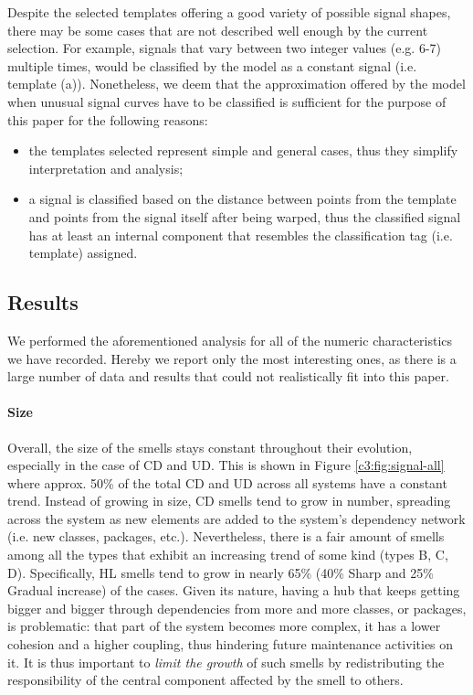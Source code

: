 Despite the selected templates offering a good variety of possible signal shapes, there may be some cases that are not described well enough by the current selection. For example, signals that vary between two integer values (e.g. 6-7) multiple times, would be classified by the model as a constant signal (i.e. template (a)).
Nonetheless, we deem that the approximation offered by the model when unusual signal curves have to be classified is sufficient for the purpose of this paper for the following reasons:
\begin{itemize}
    \item the templates selected represent simple and general cases, thus they simplify interpretation and analysis;
    \item a signal is classified based on the distance between points from the template and points from the signal itself after being warped, thus the classified signal has at least an internal component that resembles the classification tag (i.e. template) assigned.
\end{itemize}

\subsection{Results}
We performed the aforementioned analysis for all of the numeric characteristics we have recorded.
Hereby we report only the most interesting ones, as there is a large number of data and results that could not realistically fit into this paper.
\paragraph{Size}
Overall, the size of the smells stays constant throughout their evolution, especially in the case of CD and UD. This is shown in Figure \ref{c3:fig:signal-all} where approx. 50\% of the total CD and UD across all systems have a constant trend.
Instead of growing in size, CD smells tend to grow in number, spreading across the system as new elements are added to the system's dependency network (i.e. new classes, packages, etc.).
Nevertheless, there is a fair amount of smells among all the types that exhibit an increasing trend of some kind (types B, C, D).
Specifically, HL smells tend to grow in nearly 65\% (40\% Sharp and 25\% Gradual increase) of the cases. Given its nature, having a hub that keeps getting bigger and bigger through dependencies from more and more classes, or packages, is problematic: that part of the system becomes more complex, it has a lower cohesion and a higher coupling, thus hindering future maintenance activities on it.
It is thus important to \emph{limit the growth} of such smells by redistributing the responsibility of the central component affected by the smell to others.

